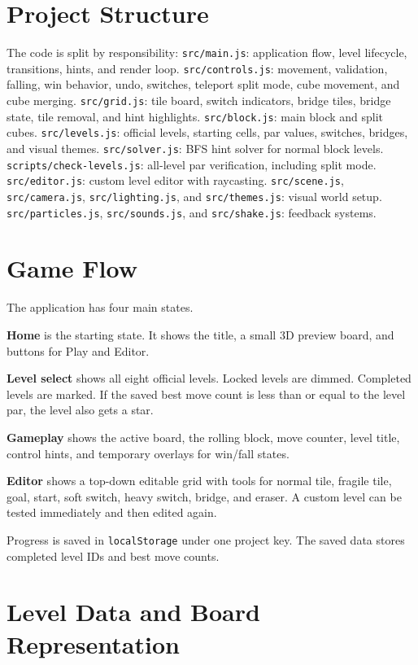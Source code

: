 \documentclass[11pt,a4paper]{article}
\newcommand{\code}[1]{\texttt{#1}}
\begin{document}
\section{Project Structure}

The code is split by responsibility:
\code{src/main.js}: application flow, level lifecycle, transitions, hints, and render loop.
\code{src/controls.js}: movement, validation, falling, win behavior, undo, switches, teleport split mode, cube movement, and cube merging.
\code{src/grid.js}: tile board, switch indicators, bridge tiles, bridge state, tile removal, and hint highlights.
\code{src/block.js}: main block and split cubes.
\code{src/levels.js}: official levels, starting cells, par values, switches, bridges, and visual themes.
\code{src/solver.js}: BFS hint solver for normal block levels.
\code{scripts/check-levels.js}: all-level par verification, including split mode.
\code{src/editor.js}: custom level editor with raycasting.
\code{src/scene.js}, \code{src/camera.js}, \code{src/lighting.js}, and \code{src/themes.js}: visual world setup.
\code{src/particles.js}, \code{src/sounds.js}, and \code{src/shake.js}: feedback systems.

\section{Game Flow}

The application has four main states.

\textbf{Home} is the starting state. It shows the title, a small 3D preview board, and buttons for Play and Editor.

\textbf{Level select} shows all eight official levels. Locked levels are dimmed. Completed levels are marked. If the saved best move count is less than or equal to the level par, the level also gets a star.

\textbf{Gameplay} shows the active board, the rolling block, move counter, level title, control hints, and temporary overlays for win/fall states.

\textbf{Editor} shows a top-down editable grid with tools for normal tile, fragile tile, goal, start, soft switch, heavy switch, bridge, and eraser. A custom level can be tested immediately and then edited again.

Progress is saved in \code{localStorage} under one project key. The saved data stores completed level IDs and best move counts.

\section{Level Data and Board Representation}
\end{document}
